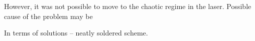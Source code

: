 However, it was not possible to move to the chaotic regime in the laser. Possible cause of the problem may be
\begin{itemize}
    
    
\end{itemize}
In terms of solutions -- neatly soldered scheme.



